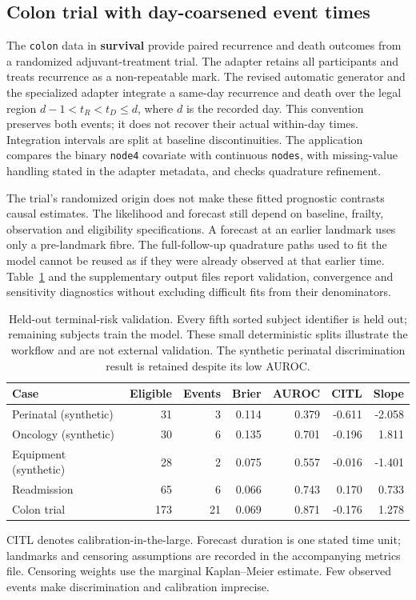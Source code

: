 \documentclass[article,nojss]{jss}
\newcommand{\pkg}[1]{\textbf{#1}}
\newcommand{\code}[1]{\texttt{#1}}
\begin{document}
\subsection{Colon trial with day-coarsened event times}
The \code{colon} data in \pkg{survival} provide paired recurrence and death outcomes from a randomized adjuvant-treatment trial. The adapter retains all participants and treats recurrence as a non-repeatable mark. The revised automatic generator and the specialized adapter integrate a same-day recurrence and death over the legal region $d-1<t_R<t_D\leq d$, where $d$ is the recorded day. This convention preserves both events; it does not recover their actual within-day times. Integration intervals are split at baseline discontinuities. The application compares the binary \code{node4} covariate with continuous \code{nodes}, with missing-value handling stated in the adapter metadata, and checks quadrature refinement.

The trial's randomized origin does not make these fitted prognostic contrasts causal estimates. The likelihood and forecast still depend on baseline, frailty, observation and eligibility specifications. A forecast at an earlier landmark uses only a pre-landmark fibre. The full-follow-up quadrature paths used to fit the model cannot be reused as if they were already observed at that earlier time. Table~\ref{tab:validation} and the supplementary output files report validation, convergence and sensitivity diagnostics without excluding difficult fits from their denominators.

\begin{table}[tbp]
\centering\small
\begin{tabular}{lrrrrrr}
\toprule
Case & Eligible & Events & Brier & AUROC & CITL & Slope \\
\midrule
Perinatal (synthetic) & 31 & 3 & 0.114 & 0.379 & -0.611 & -2.058 \\
Oncology (synthetic) & 30 & 6 & 0.135 & 0.701 & -0.196 & 1.811 \\
Equipment (synthetic) & 28 & 2 & 0.075 & 0.557 & -0.016 & -1.401 \\
Readmission & 65 & 6 & 0.066 & 0.743 & 0.170 & 0.733 \\
Colon trial & 173 & 21 & 0.069 & 0.871 & -0.176 & 1.278 \\
\bottomrule
\end{tabular}
\caption{Held-out terminal-risk validation. Every fifth sorted subject identifier is held out; remaining subjects train the model. These small deterministic splits illustrate the workflow and are not external validation. The synthetic perinatal discrimination result is retained despite its low AUROC.}\label{tab:validation}
\begin{minipage}{\textwidth}\footnotesize CITL denotes calibration-in-the-large. Forecast duration is one stated time unit; landmarks and censoring assumptions are recorded in the accompanying metrics file. Censoring weights use the marginal Kaplan--Meier estimate. Few observed events make discrimination and calibration imprecise.\end{minipage}
\end{table}
\end{document}
